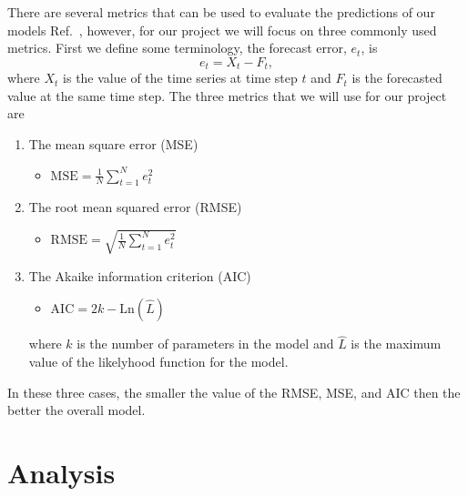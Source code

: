 \documentclass[10pt,a4paper]{article}
\begin{document}
There are several metrics that can be used to evaluate the predictions of our models Ref.~\cite{Adhikari_2013}, however, for our project we will focus on three commonly used metrics. First we define some terminology, the forecast error, $e_t$, is
\begin{equation}
e_{t} = X_t - F_t,
\end{equation}
where $X_t$ is the value of the time series at time step $t$ and $F_t$ is the forecasted value at the same time step. The three metrics that we will use for our project are
\begin{enumerate}

\item  The mean square error (MSE)
\begin{itemize}
\item $\text{MSE} = \frac{1}{N}\sum\limits_{t=1}^{N} e^2_{t} $
\end{itemize}

\item  The root mean squared error (RMSE)
\begin{itemize}
\item $\text{RMSE} = \sqrt{\frac{1}{N}\sum\limits_{t=1}^{N} e^2_{t}} $
\end{itemize}

\item The Akaike information criterion (AIC)
\begin{itemize}
\item $\text{AIC} = 2k - \text{Ln}(\hat{L})$
\end{itemize}
where $k$ is the number of parameters in the model and $\hat{L}$ is the maximum value of the likelyhood function for the model.

\end{enumerate}
\noindent
In these three cases, the smaller the value of the RMSE, MSE, and AIC then the better the overall model.


\newpage
\section{Analysis}
\end{document}
